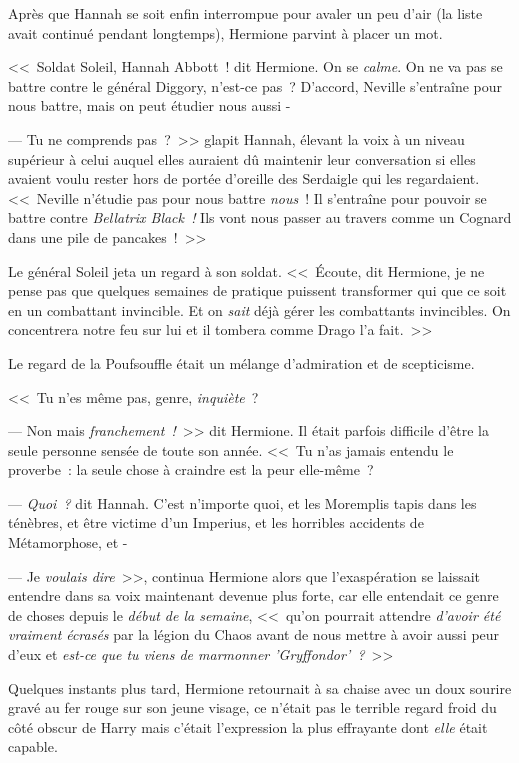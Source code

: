 Après que Hannah se soit enfin interrompue pour avaler un peu d'air (la liste avait continué pendant longtemps), Hermione parvint à placer un mot.

<<~Soldat Soleil, Hannah Abbott~! dit Hermione. On se \emph{calme}. On ne va pas se battre contre le général Diggory, n'est-ce pas~? D'accord, Neville s'entraîne pour nous battre, mais on peut étudier nous aussi -

--- Tu ne comprends pas~?~>> glapit Hannah, élevant la voix à un niveau supérieur à celui auquel elles auraient dû maintenir leur conversation si elles avaient voulu rester hors de portée d'oreille des Serdaigle qui les regardaient. <<~Neville n'étudie pas pour nous battre \emph{nous}~! Il s'entraîne pour pouvoir se battre contre \emph{Bellatrix Black~!} Ils vont nous passer au travers comme un Cognard dans une pile de pancakes~!~>>

Le général Soleil jeta un regard à son soldat. <<~Écoute, dit Hermione, je ne pense pas que quelques semaines de pratique puissent transformer qui que ce soit en un combattant invincible. Et on \emph{sait} déjà gérer les combattants invincibles. On concentrera notre feu sur lui et il tombera comme Drago l'a fait.~>>

Le regard de la Poufsouffle était un mélange d'admiration et de scepticisme.

<<~Tu n'es même pas, genre, \emph{inquiète}~?

--- Non mais \emph{franchement~!}~>> dit Hermione. Il était parfois difficile d'être la seule personne sensée de toute son année. <<~Tu n'as jamais entendu le proverbe~: la seule chose à craindre est la peur elle-même~?

--- \emph{Quoi~?} dit Hannah. C'est n'importe quoi, et les Moremplis tapis dans les ténèbres, et être victime d'un Imperius, et les horribles accidents de Métamorphose, et -

--- Je \emph{voulais dire}~>>, continua Hermione alors que l'exaspération se laissait entendre dans sa voix maintenant devenue plus forte, car elle entendait ce genre de choses depuis le \emph{début de la semaine}, <<~qu'on pourrait attendre \emph{d'avoir été} \emph{vraiment} \emph{écrasés} par la légion du Chaos avant de nous mettre à avoir aussi peur d'eux et \emph{est-ce que tu viens de marmonner 'Gryffondor'~?}~>>

Quelques instants plus tard, Hermione retournait à sa chaise avec un doux sourire gravé au fer rouge sur son jeune visage, ce n'était pas le terrible regard froid du côté obscur de Harry mais c'était l'expression la plus effrayante dont \emph{elle} était capable.

